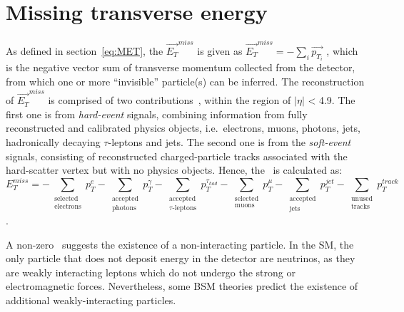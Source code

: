 \section{Missing transverse energy}
As defined in section~\ref{eq:MET}, the $\vec{E_T}^{miss}$ is given 
as
$\vec{E_T}^{miss}=-\sum_i \vec{p_{T_i}}$
,
which is the negative vector sum of transverse momentum collected from the 
detector, from which one or more ``invisible'' particle(s) can be inferred.
The reconstruction of $\vec{E_T}^{miss}$ is comprised of two contributions~\cite{MET2018},
within the region of $|\eta|$ < 4.9. 
The first one is from \textit{hard-event} signals, combining 
information from fully reconstructed and calibrated 
physics objects, i.e.\ electrons, muons, photons, jets,
hadronically decaying $\tau$-leptons and jets. 
The second one is from the \textit{soft-event} signals, consisting of 
reconstructed charged-particle tracks associated with the hard-scatter
vertex but with no physics objects.
Hence, the \MET\ is calculated as:
\[ E^{miss}_T = - \sum_{\substack{\text{selected}\\ \text{electrons}}} p^e_T 
- \sum_{\substack{\text{accepted} \\  \text{photons}}} p^{\gamma}_T   
- \sum_{\substack{\text{accepted} \\  \text{$\tau$-leptons}}} p^{\tau_{had}}_T 
- \sum_{\substack{\text{selected} \\  \text{muons}}} p^{\mu}_T 
- \sum_{\substack{\text{accepted} \\  \text{jets}}} p^{jet}_T 
- \sum_{\substack{\text{unused}\\ \text{tracks}}} p^{track}_T
\].


A non-zero \MET\ suggests
the existence of a non-interacting particle.
In the SM, the only particle that does
not deposit energy in the detector are neutrinos, 
as they are weakly interacting leptons
which do not undergo the strong or electromagnetic forces.
Nevertheless, some BSM theories predict
the existence of additional weakly-interacting particles.

